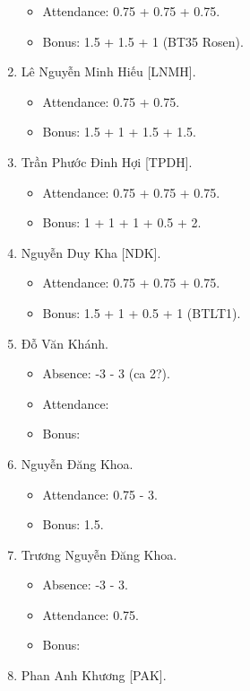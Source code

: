 \documentclass{article}
\begin{document}
\begin{enumerate}
    \begin{itemize}
        \item Attendance: 0.75 + 0.75 + 0.75.
        \item Bonus: 1.5 + 1.5 + 1 (BT35 Rosen).
    \end{itemize}
    \item {\sc Lê Nguyễn Minh Hiếu [LNMH].}
    \begin{itemize}
        \item Attendance: 0.75 + 0.75.
        \item Bonus: 1.5 + 1 + 1.5 + 1.5.
    \end{itemize}
    \item {\sc Trần Phước Đinh Hợi [TPDH].}
    \begin{itemize}
        \item Attendance: 0.75 + 0.75 + 0.75.
        \item Bonus: 1 + 1 + 1 + 0.5 + 2.
    \end{itemize}
    \item {\sc Nguyễn Duy Kha [NDK].}
    \begin{itemize}
        \item Attendance: 0.75 + 0.75 + 0.75.
        \item Bonus: 1.5 + 1 + 0.5 + 1 (BTLT1).
    \end{itemize}
    \item {\sc Đỗ Văn Khánh.}
    \begin{itemize}
        \item Absence: -3 - 3 (ca 2?).
        \item Attendance:
        \item Bonus:
    \end{itemize}
    \item {\sc Nguyễn Đăng Khoa.}
    \begin{itemize}
        \item Attendance: 0.75 - 3.
        \item Bonus: 1.5.
    \end{itemize}
    \item {\sc Trương Nguyễn Đăng Khoa.}
    \begin{itemize}
        \item Absence: -3 - 3.
        \item Attendance: 0.75.
        \item Bonus:
    \end{itemize}
    \item {\sc Phan Anh Khương [PAK].}

\end{enumerate}
\end{document}
